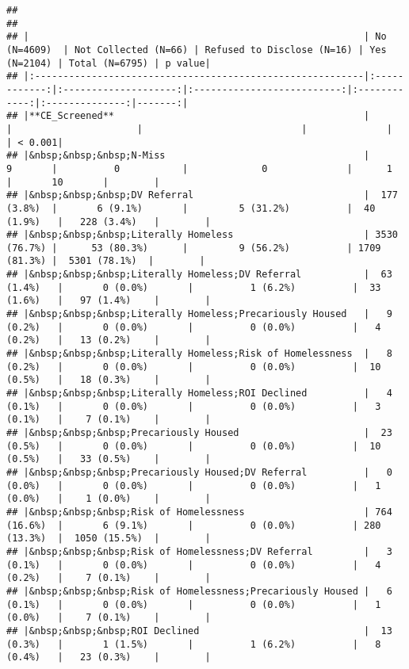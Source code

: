 \documentclass[
]{article}
\begin{document}
\begin{verbatim}
## 
## 
## |                                                           | No (N=4609)  | Not Collected (N=66) | Refused to Disclose (N=16) | Yes (N=2104) | Total (N=6795) | p value|
## |:----------------------------------------------------------|:------------:|:--------------------:|:--------------------------:|:------------:|:--------------:|-------:|
## |**CE_Screened**                                            |              |                      |                            |              |                | < 0.001|
## |&nbsp;&nbsp;&nbsp;N-Miss                                   |      9       |          0           |             0              |      1       |       10       |        |
## |&nbsp;&nbsp;&nbsp;DV Referral                              |  177 (3.8%)  |       6 (9.1%)       |         5 (31.2%)          |  40 (1.9%)   |   228 (3.4%)   |        |
## |&nbsp;&nbsp;&nbsp;Literally Homeless                       | 3530 (76.7%) |      53 (80.3%)      |         9 (56.2%)          | 1709 (81.3%) |  5301 (78.1%)  |        |
## |&nbsp;&nbsp;&nbsp;Literally Homeless;DV Referral           |  63 (1.4%)   |       0 (0.0%)       |          1 (6.2%)          |  33 (1.6%)   |   97 (1.4%)    |        |
## |&nbsp;&nbsp;&nbsp;Literally Homeless;Precariously Housed   |   9 (0.2%)   |       0 (0.0%)       |          0 (0.0%)          |   4 (0.2%)   |   13 (0.2%)    |        |
## |&nbsp;&nbsp;&nbsp;Literally Homeless;Risk of Homelessness  |   8 (0.2%)   |       0 (0.0%)       |          0 (0.0%)          |  10 (0.5%)   |   18 (0.3%)    |        |
## |&nbsp;&nbsp;&nbsp;Literally Homeless;ROI Declined          |   4 (0.1%)   |       0 (0.0%)       |          0 (0.0%)          |   3 (0.1%)   |    7 (0.1%)    |        |
## |&nbsp;&nbsp;&nbsp;Precariously Housed                      |  23 (0.5%)   |       0 (0.0%)       |          0 (0.0%)          |  10 (0.5%)   |   33 (0.5%)    |        |
## |&nbsp;&nbsp;&nbsp;Precariously Housed;DV Referral          |   0 (0.0%)   |       0 (0.0%)       |          0 (0.0%)          |   1 (0.0%)   |    1 (0.0%)    |        |
## |&nbsp;&nbsp;&nbsp;Risk of Homelessness                     | 764 (16.6%)  |       6 (9.1%)       |          0 (0.0%)          | 280 (13.3%)  |  1050 (15.5%)  |        |
## |&nbsp;&nbsp;&nbsp;Risk of Homelessness;DV Referral         |   3 (0.1%)   |       0 (0.0%)       |          0 (0.0%)          |   4 (0.2%)   |    7 (0.1%)    |        |
## |&nbsp;&nbsp;&nbsp;Risk of Homelessness;Precariously Housed |   6 (0.1%)   |       0 (0.0%)       |          0 (0.0%)          |   1 (0.0%)   |    7 (0.1%)    |        |
## |&nbsp;&nbsp;&nbsp;ROI Declined                             |  13 (0.3%)   |       1 (1.5%)       |          1 (6.2%)          |   8 (0.4%)   |   23 (0.3%)    |        |
\end{verbatim}
\end{document}
